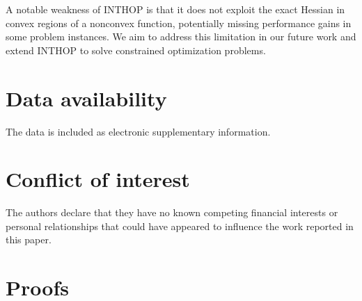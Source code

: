 \documentclass{elsarticle}
\numberwithin{equation}{section}
\begin{document}
A notable weakness of INTHOP is that it does not exploit the exact Hessian in convex regions of a nonconvex function, potentially missing performance gains in some problem instances. We aim to address this limitation in our future work and extend INTHOP to solve constrained optimization problems.

    \section*{Data availability}

The data is included as electronic supplementary information.



\section*{Conflict of interest}

 The authors declare that they have no known competing financial interests or personal relationships
that could have appeared to influence the work reported in this paper.






\clearpage %
\appendix
{} %
\appendix

\section{Proofs} \label{appendix:proofs}
\end{document}
